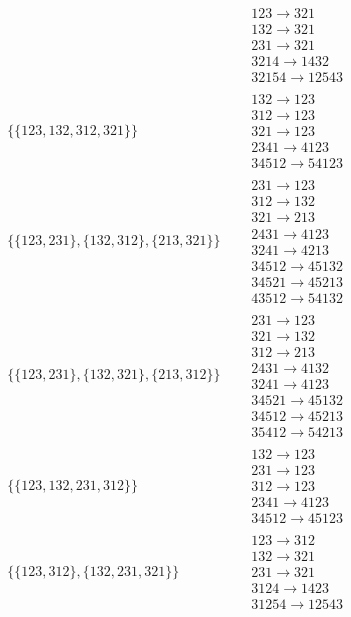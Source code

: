 \begin{tiny}
\begin{align}
\quad
&
\begin{matrix}
123 \to 321\\132 \to 321\\231 \to 321\\3214 \to 1432\\32154 \to 12543
\end{matrix}
\\
\{\{123, 132, 312, 321\}\}
\quad
&
\begin{matrix}
132 \to 123\\312 \to 123\\321 \to 123\\2341 \to 4123\\34512 \to 54123
\end{matrix}
\\
\{\{123, 231\}, \{132, 312\}, \{213, 321\}\}
\quad
&
\begin{matrix}
231 \to 123\\312 \to 132\\321 \to 213\\2431 \to 4123\\3241 \to 4213\\34512 \to 45132\\34521 \to 45213\\43512 \to 54132
\end{matrix}
\\
\{\{123, 231\}, \{132, 321\}, \{213, 312\}\}
\quad
&
\begin{matrix}
231 \to 123\\321 \to 132\\312 \to 213\\2431 \to 4132\\3241 \to 4123\\34521 \to 45132\\34512 \to 45213\\35412 \to 54213
\end{matrix}
\\
\{\{123, 132, 231, 312\}\}
\quad
&
\begin{matrix}
132 \to 123\\231 \to 123\\312 \to 123\\2341 \to 4123\\34512 \to 45123
\end{matrix}
\\
\{\{123, 312\}, \{132, 231, 321\}\}
\quad
&
\begin{matrix}
123 \to 312\\132 \to 321\\231 \to 321\\3124 \to 1423\\31254 \to 12543

\end{matrix}
\end{align}
\end{tiny}
